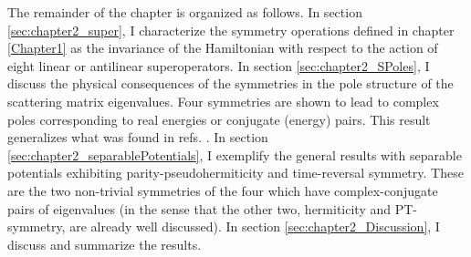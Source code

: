 The remainder of the chapter is organized as follows. In section \ref{sec:chapter2_super}, I characterize the symmetry operations defined in chapter \ref{Chapter1} as the invariance of the Hamiltonian with respect to the action of eight linear or antilinear superoperators. In section \ref{sec:chapter2_SPoles}, I discuss the physical consequences of the symmetries in the pole structure of the scattering matrix eigenvalues. Four symmetries are shown to lead to complex poles corresponding to real energies or conjugate (energy) pairs. This result generalizes what was found in refs. \cite{Mostafazadeh2002,Mostafazadeh2002a,Mostafazadeh2002b}. In section \ref{sec:chapter2_separablePotentials}, I exemplify the general results with separable potentials exhibiting parity-pseudohermiticity and time-reversal symmetry. These are the two non-trivial symmetries of the four which have complex-conjugate pairs of eigenvalues (in the sense that the other two, hermiticity and PT-symmetry, are already well discussed). In section \ref{sec:chapter2_Discussion}, I discuss and summarize the results.
%
